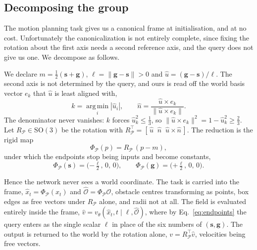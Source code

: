 \documentclass[10pt,twocolumn,letterpaper]{article}
\newcommand{\svec}{\mathbf{s}}
\newcommand{\gvec}{\mathbf{g}}
\begin{document}
\subsection{Decomposing the group}
\label{sec:decompose}

The motion planning task gives us a canonical frame at initialisation, and at no
cost. Unfortunately the canonicalization is not entirely complete, since fixing
the rotation about the first axis needs a second reference axis, and the query
does not give us one. We decompose as follows.

We declare $m = \tfrac{1}{2}(\svec + \gvec)$, $\ell = \|\gvec - \svec\| > 0$
and $\hat{u} = (\gvec - \svec)/\ell$. The second axis is not determined by the
query, and ours is read off the world basis vector $e_k$ that $\hat{u}$ is least
aligned with,
\begin{equation}
  k = \operatorname*{arg\,min}_{i} |\hat{u}_i| ,
  \qquad
  \hat{n} = \frac{\hat{u} \times e_k}{\|\hat{u} \times e_k\|} .
  \label{eq:second-axis}
\end{equation}
The denominator never vanishes: $k$ forces $\hat{u}_k^2 \le \tfrac{1}{3}$, so
$\|\hat{u} \times e_k\|^2 = 1 - \hat{u}_k^2 \ge \tfrac{2}{3}$. Let
$R_{\mathcal{P}} \in \mathrm{SO}(3)$ be the rotation with
$R_{\mathcal{P}}^{\top} = [\,\hat{u}\;\; \hat{n}\;\; \hat{u} \times \hat{n}\,]$.
The reduction is the rigid map
\begin{equation}
  \Phi_{\mathcal{P}}(p) = R_{\mathcal{P}}\,(p - m),
  \label{eq:reduction}
\end{equation}
under which the endpoints stop being inputs and become constants,
\begin{equation}
  \Phi_{\mathcal{P}}(\svec) = \big({-\tfrac{\ell}{2}},\, 0,\, 0\big),
  \qquad
  \Phi_{\mathcal{P}}(\gvec) = \big({+\tfrac{\ell}{2}},\, 0,\, 0\big).
  \label{eq:endpoints}
\end{equation}

Hence the network never sees a world coordinate. The task is carried into the
frame, $\hat{x}_t = \Phi_{\mathcal{P}}(x_t)$ and
$\hat{\mathcal{O}} = \Phi_{\mathcal{P}}\mathcal{O}$, obstacle centres transforming
as points, box edges as free vectors under $R_{\mathcal{P}}$ alone, and radii not
at all. The field is evaluated entirely inside the frame,
$\hat{v} = v_\theta(\hat{x}_t, t \mid \ell, \hat{\mathcal{O}})$, where by
Eq.~\eqref{eq:endpoints} the query enters as the single scalar $\ell$ in place of
the six numbers of $(\svec, \gvec)$. The output is returned to the world by the
rotation alone, $v = R_{\mathcal{P}}^{\top}\hat{v}$, velocities being free
vectors.
\end{document}
